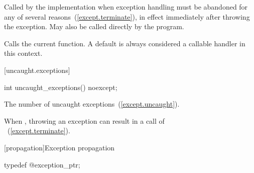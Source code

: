 \begin{itemdescr}
\pnum
\remarks
Called by the implementation when exception
handling must be abandoned for any of several reasons~(\ref{except.terminate}),
in effect immediately after throwing the exception.
May also be called directly by the program.

\pnum
\effects
Calls the current  function. \enternote A
default  is always considered a callable handler in
this context. \exitnote
\end{itemdescr}

[uncaught.exceptions]{}

%
\begin{itemdecl}
int uncaught_exceptions() noexcept;
\end{itemdecl}

\begin{itemdescr}
\pnum
\returns
The number of uncaught exceptions~(\ref{except.uncaught}).

\pnum
\notes
When ,
throwing an exception can result in a call of\\
~(\ref{except.terminate}).
\end{itemdescr}

[propagation]{Exception propagation}

\begin{itemdecl}
typedef @\unspec@ exception_ptr;
\end{itemdecl}


